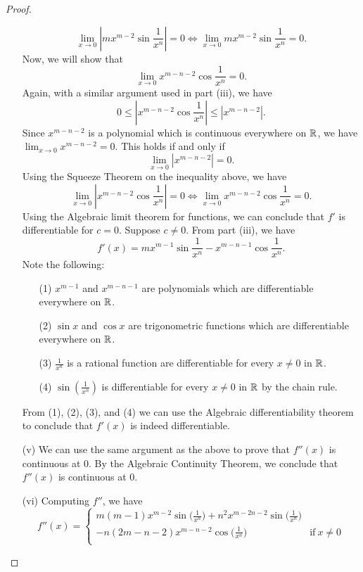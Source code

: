 \documentclass[a4paper]{article}
\begin{document}
\begin{proof}
\begin{enumerate}
        \[  \lim_{ x \to 0 } | m x^{m-2} \sin \frac{ 1 }{ x^{n} }  | = 0  \iff \lim_{ x \to 0 }  m x^{m-2} \sin \frac{ 1 }{ x^{n} } = 0.  \]
        Now, we will show that 
        \[  \lim_{ x \to 0 }  x^{m-n-2} \cos \frac{ 1 }{ x^{n} } = 0. \]
        Again, with a similar argument used in part (iii), we have 
        \[  0 \leq | x^{m-n-2} \cos \frac{ 1 }{ x^{n} }  | \leq | x^{m-n-2} |. \tag{\( | \cos x  | \leq 1  \ \forall x \in \R  \)}  \]
        Since \( x^{m-n-2} \) is a polynomial which is continuous everywhere on \( \mathbb{R}  \), we have \( \lim_{ x \to 0 }  x^{m-n-2} = 0  \). This holds if and only if
        \[  \lim_{ x \to 0 }  | x^{m-n-2} |  = 0.  \]
        Using the Squeeze Theorem on the inequality above, we have 
        \[  \lim_{ x \to 0 }  | x^{m-n-2}  \cos \frac{ 1 }{ x^{n} }  |  = 0 \iff \lim_{ x \to 0 }  x^{m-n-2} \cos \frac{ 1 }{ x^{n} }  = 0.   \]
        Using the Algebraic limit theorem for functions, we can conclude that \( f'  \) is differentiable for \( c = 0  \). Suppose \( c \neq 0  \). From part (iii), we have         
        \[  f'(x) = m x^{m-1} \sin \frac{  1 }{ x^{n} } - x^{m-n-1} \cos \frac{ 1 }{ x^{n} }. \]
        Note the following:
        \begin{enumerate}
            \item[(1)] \( x^{m-1} \) and \( x^{m-n-1} \) are polynomials which are differentiable everywhere on \( \mathbb{R}  \).
            \item[(2)] \( \sin x  \) and \( \cos x  \) are trigonometric functions which are differentiable everywhere on \( \mathbb{R}  \).
            \item[(3)] \( \frac{ 1 }{ x^{n} }  \) is a rational function are differentiable for every \( x \neq 0  \) in \( \mathbb{R}  \).
            \item[(4)] \( \sin (\frac{ 1 }{ x^{n} } ) \) is differentiable for every \( x \neq 0  \) in \( \mathbb{R}  \) by the chain rule.
        \end{enumerate}
        From (1), (2), (3), and (4) we can use the Algebraic differentiability theorem to conclude that \( f'(x) \) is indeed differentiable.
    \item[(v)] We can use the same argument as the above to prove that \( f''(x) \) is continuous at \( 0  \). By the Algebraic Continuity Theorem, we conclude that \( f''(x) \) is continuous at \( 0  \).  
    \item[(vi)] Computing \( f'' \), we have 
        \[  f''(x) = 
        \begin{cases}
            m(m-1)x^{m-2} \sin \Big(  \frac{ 1 }{ x^{n} }  \Big)  + n^{2} x^{m-2n-2} \sin \Big(  \frac{ 1 }{ x^{n} } \Big) \\ - n (2m - n - 2) x^{m-n-2} \cos \Big(  \frac{ 1 }{ x^{n} }  \Big)  &\text{if} \ x \neq 0  \\

\end{cases}\]
\end{enumerate}
\end{proof}
\end{document}
